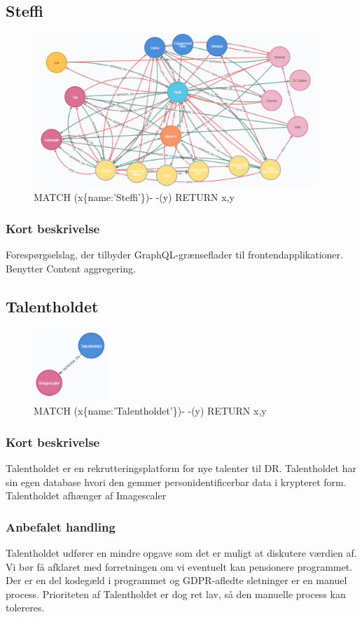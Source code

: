 \documentclass{article}
\begin{document}
\subsection{Steffi}
\begin{figure}[h]
\includegraphics[width=300pt]{Steffi.PNG}
\caption{MATCH (x\{name:'Steffi'\})- -(y) RETURN x,y}
\end{figure}
\subsubsection*{Kort beskrivelse}
Forespørgselslag, der tilbyder GraphQL-grænseflader til frontendapplikationer.
Benytter Content aggregering.



\subsection{Talentholdet}
\begin{figure}[h]
\includegraphics[width=80pt]{Talentholdet.PNG}
\caption{MATCH (x\{name:'Talentholdet'\})- -(y) RETURN x,y}
\end{figure}
\subsubsection*{Kort beskrivelse}
Talentholdet er en rekrutteringsplatform for nye talenter til DR. Talentholdet har sin egen database hvori den gemmer personidentificerbar data i krypteret form. Talentholdet afhænger af Imagescaler
\subsubsection*{Anbefalet handling}
Talentholdet udfører en mindre opgave som det er muligt at diskutere værdien af. Vi bør få afklaret med forretningen om vi eventuelt kan pensionere programmet. Der er en del kodegæld i programmet og GDPR-afledte sletninger er en manuel process.
Prioriteten af Talentholdet er dog ret lav, så den manuelle process kan tolereres.
\end{document}
